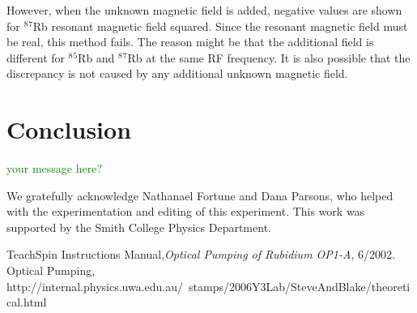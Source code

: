 \documentclass[prb,preprint]{revtex4-1}
\begin{document}

However, when the unknown magnetic field is added, negative values are shown for $^8$$^7$Rb resonant magnetic field squared. Since the resonant magnetic field must be real, this method fails. The reason might be that the additional field is different for $^8$$^5$Rb and $^8$$^7$Rb at the same RF frequency. It is also possible that the discrepancy is not caused by any additional unknown magnetic field. 


\section{Conclusion}

\textcolor{green}{your message here?}

\begin{acknowledgments}

We gratefully acknowledge Nathanael Fortune and Dana Parsons, who helped with the experimentation and editing of this experiment.  This work was supported by the Smith College Physics Department.

\end{acknowledgments}


\begin{thebibliography}{99}

 TeachSpin Instructions Manual,\textit{Optical Pumping of Rubidium OP1-A}, 6/2002.
 Optical Pumping, http://internal.physics.uwa.edu.au/~stamps/2006Y3Lab/SteveAndBlake/theoretical.html

\end{thebibliography}

\end{document}
